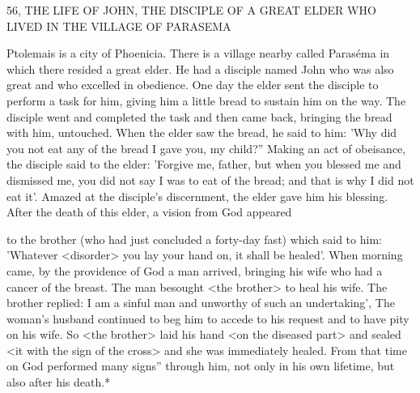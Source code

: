 56, THE LIFE OF JOHN, THE DISCIPLE
OF A GREAT ELDER WHO LIVED IN
THE VILLAGE OF PARASEMA

Ptolemais is a city of Phoenicia.
There is a village nearby called
Paraséma in which there resided a great elder.
He had a disciple
named John who was also great and who excelled in obedience.
One
day the elder sent the disciple to perform a task for him, giving him
a little bread to sustain him on the way.
The disciple went and
completed the task and then came back, bringing the bread with
him, untouched.
When the elder saw the bread, he said to him:
'Why did you not eat any of the bread I gave you, my child?”
Making an act of obeisance, the disciple said to the elder: 'Forgive
me, father, but when you blessed me and dismissed me, you did not
say I was to eat of the bread; and that is why I did not eat it'.
Amazed at the disciple's discernment, the elder gave him his
blessing.
After the death of this elder, a vision from God appeared

to the brother (who had just concluded a forty-day fast) which said
to him: 'Whatever <disorder> you lay your hand on, it shall be
healed'.
When morning came, by the providence of God a man
arrived, bringing his wife who had a cancer of the breast.
The man
besought <the brother> to heal his wife.
The brother replied: I am
a sinful man and unworthy of such an undertaking', The woman's
husband continued to beg him to accede to his request and to have
pity on his wife.
So <the brother> laid his hand <on the diseased
part> and sealed <it with the sign of the cross> and she was
immediately healed.
From that time on God performed many signs”
through him, not only in his own lifetime, but also after his death.*

